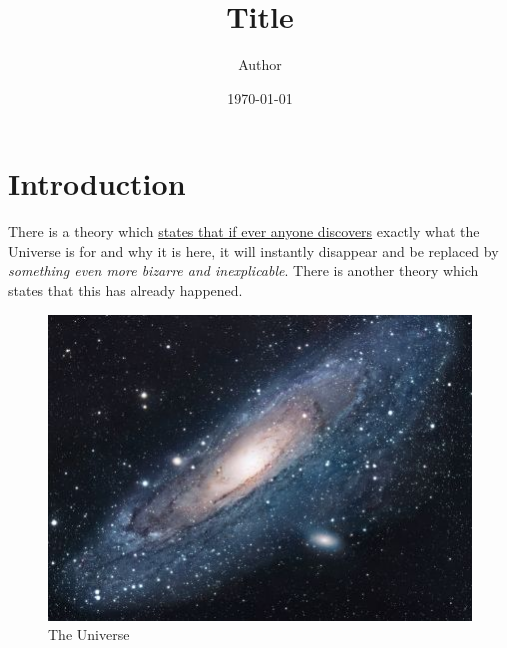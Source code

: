 \documentclass{article}
\title{Title}
\author{Author}
\date{\today}
\begin{document}
\maketitle
\fi

\section{Introduction}
There is a theory which \uline{states that if ever anyone discovers} exactly what the Universe is for and why it is here, it will instantly disappear and be replaced by \emph{something even more bizarre and inexplicable}.
There is another theory which states that this has already happened.

\begin{figure}[h!]
\centering
\includegraphics[scale=1.7]{media/pic/img/universe}
\caption{The Universe}
\label{fig:universe}
\end{figure}
\ifx\allfiles\undefined
\end{document}
